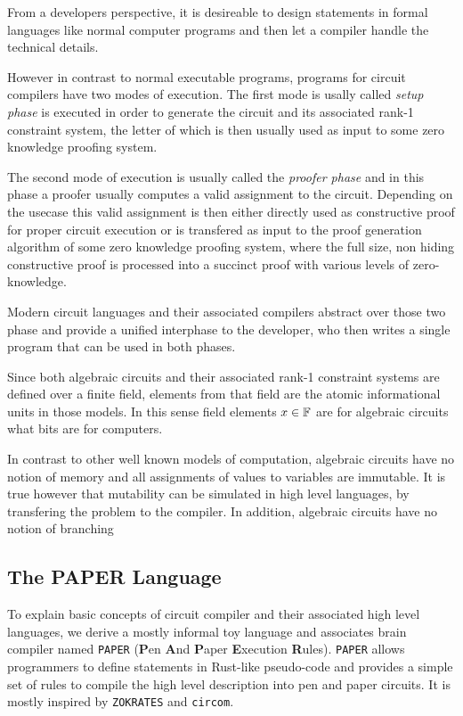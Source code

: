 From a developers perspective, it is desireable to design statements in formal languages like normal computer programs and then let a compiler handle the technical details. 

However in contrast to normal executable programs, programs for circuit compilers have two modes of execution. The first mode is usally called \textit{setup phase} is executed in order to generate the circuit and its associated rank-1 constraint system, the letter of which is then usually used as input to some zero knowledge proofing system.

The second mode of execution is usually called the \textit{proofer phase} and in this phase a proofer usually computes a valid assignment to the circuit. Depending on the usecase this valid assignment is then either directly used as constructive proof for proper circuit execution or is transfered as input to the proof generation algorithm of some zero knowledge proofing system, where the full size, non hiding constructive proof is processed into a succinct proof with various levels of zero-knowledge.

Modern circuit languages and their associated compilers abstract over those two phase and provide a unified interphase to the developer, who then writes a single program that can be used in both phases. 

Since both algebraic circuits and their associated rank-1 constraint systems are defined over a finite field, elements from that field are the atomic informational units in those models. In this sense field elements $x\in \mathbb{F}$ are for algebraic circuits what bits are for computers. 

In contrast to other well known models of computation, algebraic circuits have no notion of memory and all assignments of values to variables are immutable. It is true however that mutability can be simulated in high level languages, by transfering the problem to the compiler. In addition, algebraic circuits have no notion of branching 

\subsection{The PAPER Language} To explain basic concepts of circuit compiler and their associated high level languages, we derive a mostly informal toy language and associates brain compiler named \texttt{PAPER} (\textbf{P}en \textbf{A}nd \textbf{P}aper \textbf{E}xecution \textbf{R}ules). \texttt{PAPER} allows programmers to define statements in Rust-like pseudo-code and provides a simple set of rules to compile the high level description into pen and paper circuits. It is mostly inspired by \texttt{ZOKRATES} and \texttt{circom}.

